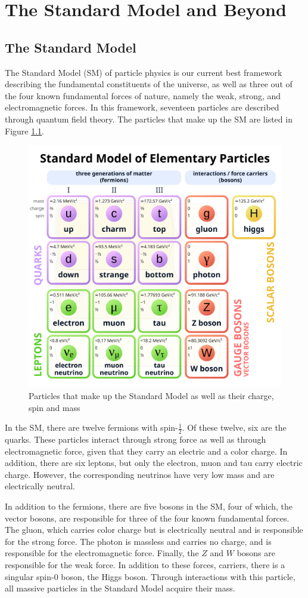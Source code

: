 \chapter{The Standard Model and Beyond}
\section{The Standard Model}

The Standard Model (SM) of particle physics is our current best framework describing the fundamental constituents of the universe, as well as three out of the four known fundamental forces of nature, namely the weak, strong, and electromagnetic forces. In this framework, seventeen particles are described through quantum field theory. The particles that make up the SM are listed in Figure \ref{fig:sm-table}.

\begin{figure}
    \centering
    \includegraphics[width=0.5\linewidth]{images/sm.png}
    \caption{Particles that make up the Standard Model as well as their charge, spin and mass \cite{}}
    \label{fig:sm-table}
\end{figure}

In the SM, there are twelve fermions with spin-$\frac12$. Of these twelve, six are the quarks. These particles interact through strong force as well as through electromagnetic force, given that they carry an electric and a color charge. In addition, there are six leptons, but only the electron, muon and tau carry electric charge. However, the corresponding neutrinos have very low mass and are electrically neutral. 

In addition to the fermions, there are five bosons in the SM, four of which, the vector bosons, are responsible for three of the four known fundamental forces. The gluon, which carries color charge but is electrically neutral and is responsible for the strong force. The photon is massless and carries no charge, and is responsible for the electromagnetic force. Finally, the $Z$ and $W$ bosons are responsible for the weak force. In addition to these forces, carriers, there is a singular spin-0 boson, the Higgs boson. Through interactions with this particle, all massive particles in the Standard Model acquire their mass.

